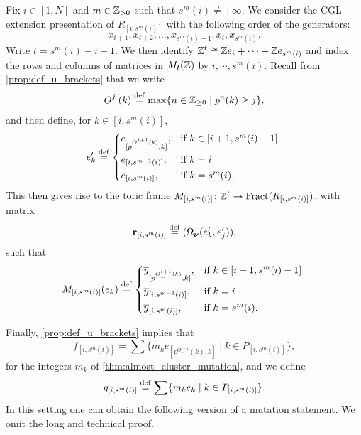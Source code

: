 Fix $i \in [1, N]$ and $m\in \mathbb{Z}_{>0}$ such that $s^m(i) \neq +\infty$. We consider
the CGL extension presentation of $R_{[i, s^m(i)]}$ with the following order of the
generators:
\begin{equation*}
	x_{i+1}, x_{i+2}, \dots, x_{s^m(i) - 1}, x_i, x_{s^m(i)}.
\end{equation*}
%
Write $t = s^m(i)-i +1$. We then identify $\mathbb{Z}^t \cong \mathbb{Z} e_i + \cdots + \mathbb{Z}
	e_{s^m(i)}$ and index the rows and columns of matrices in $M_t(\mathbb{Z})$ by $i, \cdots,
	s^m(i)$. Recall from \cref{prop:def_u_brackets} that we write
\begin{equation*}
	O_{-}^j(k) \overset{\mathrm{def}}{=} \max \{n \in \mathbb{Z}_{\geq 0} \mid p^n(k) \geq j\},
\end{equation*}
%
and then define, for $k \in [i, s^m(i)]$,
\begin{equation*}
	e'_k \defeq \begin{dcases*}
		e_{[p^{O^{i+1}_{-}(k)}, k]}, & if $k \in [i+1, s^m(i) - 1]$ \\
		e_{[i, s^{m-1}(i)]},         & if $k=i$                     \\
		e_{[i, s^m(i)]},             & if $k = s^m(i)$.
	\end{dcases*}
\end{equation*}
%
This then gives rise to the toric frame $M_{[i, s^m(i)]}\colon \mathbb{Z}^t \to \operatorname{Fract}(R_{[i,
				s^m(i)]})$, with matrix
\begin{equation*}
	\mathbf{r}_{[i, s^m (i)]} \overset{\mathrm{def}}{=} (\Omega_{\boldsymbol{\nu}}(e'_k,e'_j)),
\end{equation*}
such that
\begin{equation*}
	M_{[i, s^m(i)]}(e_k) \defeq \begin{dcases*}
		\oy_{[p^{O^{i+1}_{-}(k)}, k]}, & if $k \in [i+1, s^m(i) - 1]$ \\
		\oy_{[i, s^{m-1}(i)]},         & if $k=i$                     \\
		\oy_{[i, s^m(i)]},             & if $k = s^m(i)$.
	\end{dcases*}
\end{equation*}

Finally, \cref{prop:def_u_brackets} implies that
\begin{equation*}
	f_{[i, s^m(i)]} = \sum\{m_k e_{[p^{O^{i+1}_{-}}(k), k]} \mid k \in P_{[i, s^m(i)]}\},
\end{equation*}
for the integers $m_k$ of \cref{thm:almost_cluster_mutation}, and we define
\begin{equation*}
	g_{[i, s^m(i)]} \overset{\mathrm{def}}{=} \sum\{m_k e_k \mid k \in P_{[i, s^m(i)]}\}.
\end{equation*}
%
In this setting one can obtain the following version of a mutation statement. We omit
the long and technical proof.

